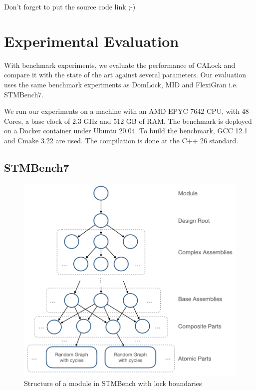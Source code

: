 
Don't forget to put the source code link ;-) 


\chapter{Experimental Evaluation} \label{chap:evaluation}
With benchmark experiments, we evaluate the performance of CALock and compare it with the state of the art against several parameters. Our evaluation uses the same benchmark experiments as DomLock, MID and FlexiGran \cite{kalikar2016domlock,anjuMID,FlexiGran2024} i.e. STMBench7\cite{guerraoui2006stmbench7}. 



We run our experiments on a machine with an AMD EPYC 7642 CPU, with 48 Cores, a base clock of 2.3 GHz and 512 GB of RAM. 
The benchmark is deployed on a Docker container under Ubuntu 20.04. 
To build the benchmark, GCC 12.1 and Cmake 3.22 are used. The compilation is done at the C++ 26 standard. 




	\section{STMBench7}
	
	
	\begin{figure}
		\captionsetup{justification=centering}
		\centering
		\includegraphics[width=.91\columnwidth]{figures/stmbenchModule}
		\caption{Structure of a module in STMBench with lock boundaries}
		\label{stmbenchModule}
	\end{figure}

